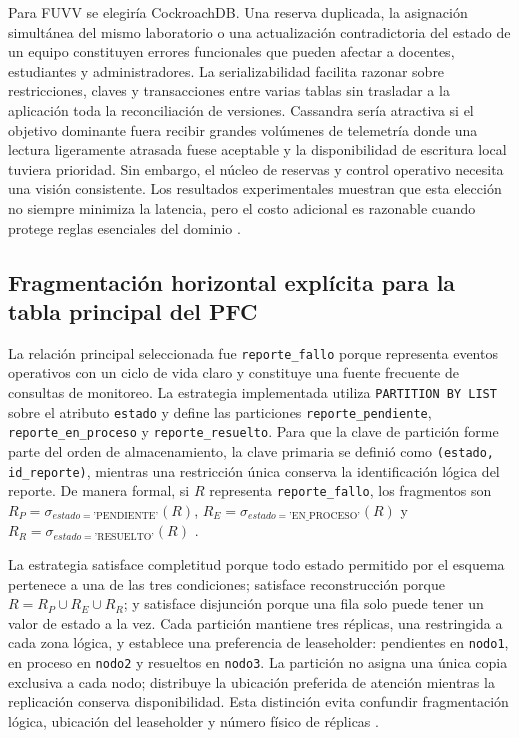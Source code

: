 \documentclass[12pt,a4paper]{article}
\begin{document}
Para FUVV se elegiría CockroachDB. Una reserva duplicada, la asignación simultánea del mismo laboratorio o una actualización contradictoria del estado de un equipo constituyen errores funcionales que pueden afectar a docentes, estudiantes y administradores. La serializabilidad facilita razonar sobre restricciones, claves y transacciones entre varias tablas sin trasladar a la aplicación toda la reconciliación de versiones. Cassandra sería atractiva si el objetivo dominante fuera recibir grandes volúmenes de telemetría donde una lectura ligeramente atrasada fuese aceptable y la disponibilidad de escritura local tuviera prioridad. Sin embargo, el núcleo de reservas y control operativo necesita una visión consistente. Los resultados experimentales muestran que esta elección no siempre minimiza la latencia, pero el costo adicional es razonable cuando protege reglas esenciales del dominio \cite{taft2020cockroachdb,ferreira2024consistency}.

\subsection{Fragmentación horizontal explícita para la tabla principal del PFC}

La relación principal seleccionada fue \texttt{reporte\_fallo} porque representa eventos operativos con un ciclo de vida claro y constituye una fuente frecuente de consultas de monitoreo. La estrategia implementada utiliza \texttt{PARTITION BY LIST} sobre el atributo \texttt{estado} y define las particiones \texttt{reporte\_pendiente}, \texttt{reporte\_en\_proceso} y \texttt{reporte\_resuelto}. Para que la clave de partición forme parte del orden de almacenamiento, la clave primaria se definió como \texttt{(estado, id\_reporte)}, mientras una restricción única conserva la identificación lógica del reporte. De manera formal, si $R$ representa \texttt{reporte\_fallo}, los fragmentos son $R_P=\sigma_{estado=\text{'PENDIENTE'}}(R)$, $R_E=\sigma_{estado=\text{'EN\_PROCESO'}}(R)$ y $R_R=\sigma_{estado=\text{'RESUELTO'}}(R)$ \cite{ozsu2020distributed,danach2024fragmentation}.

La estrategia satisface completitud porque todo estado permitido por el esquema pertenece a una de las tres condiciones; satisface reconstrucción porque $R=R_P\cup R_E\cup R_R$; y satisface disjunción porque una fila solo puede tener un valor de estado a la vez. Cada partición mantiene tres réplicas, una restringida a cada zona lógica, y establece una preferencia de leaseholder: pendientes en \texttt{nodo1}, en proceso en \texttt{nodo2} y resueltos en \texttt{nodo3}. La partición no asigna una única copia exclusiva a cada nodo; distribuye la ubicación preferida de atención mientras la replicación conserva disponibilidad. Esta distinción evita confundir fragmentación lógica, ubicación del leaseholder y número físico de réplicas \cite{taft2020cockroachdb,ozsu2020distributed}.
\end{document}

